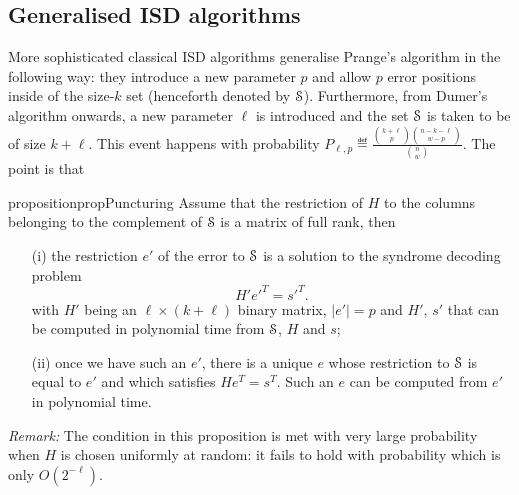 \subsection{Generalised ISD algorithms}
More sophisticated classical ISD algorithms \cite{S88,D91,FS09,BLP11,MMT11,BJMM12,MO15} generalise Prange's algorithm in the following way: they introduce a new parameter $p$ and allow $p$ error positions 
inside of the size-$k$ set (henceforth denoted by $\mathcal{S}$). Furthermore, from Dumer's algorithm onwards, a new parameter $\ell$ is introduced and the set $\mathcal{S}$ is taken to be of size $k+\ell$.
This event happens with probability $P_{\ell,p} \eqdef \frac{\binom{k+\ell}{p}\binom{n-k-\ell}{w-p}}{\binom{n}{w}}.$
The point is that
\begin{restatable}{proposition}{propPuncturing}
\label{prop:puncturing}
Assume that the restriction of $H$ to the columns belonging to the complement of $\mathcal{S}$ is a matrix of full rank, then
\begin{itemize}
\item[(i)]
the restriction $e'$ of the error to $\mathcal{S}$  is a solution to the syndrome decoding problem
 \begin{equation}\label{eq:subproblem}
H' {e'}^T = {s'}^T.
\end{equation} 
with $H'$ being an $\ell \times (k+\ell)$ binary matrix, $|e'|=p$ and $H'$, $s'$ that can be computed in polynomial time from $\mathcal{S}$, $H$ and $s$;\\
\item[(ii)] once we have such an $e'$,  there is a unique $e$ whose restriction to $\mathcal{S}$ is equal to $e'$ and which satisfies
$He^T = s^T$. Such an $e$ can be computed from $e'$ in polynomial time.
\end{itemize}
\end{restatable}

\noindent
{\em Remark:} The condition in this proposition is met with very large probability when $H$ is chosen uniformly at random:
it fails to hold with probability which is only $O(2^{-\ell})$.

